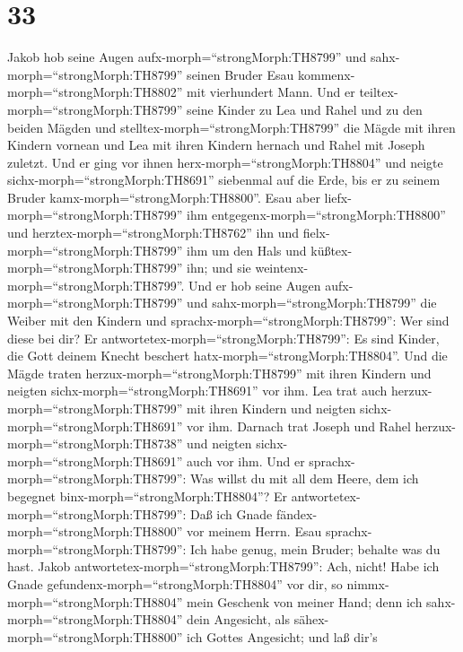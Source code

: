 \hypertarget{section-32}{%
\section{33}\label{section-32}}

 Jakob hob seine Augen aufx-morph=``strongMorph:TH8799'' und
sahx-morph=``strongMorph:TH8799'' seinen Bruder Esau
kommenx-morph=``strongMorph:TH8802'' mit vierhundert Mann. Und er
teiltex-morph=``strongMorph:TH8799'' seine Kinder zu Lea und Rahel und
zu den beiden Mägden  und
stelltex-morph=``strongMorph:TH8799'' die Mägde mit ihren Kindern
vornean und Lea mit ihren Kindern hernach und Rahel mit Joseph zuletzt.
 Und er ging vor ihnen herx-morph=``strongMorph:TH8804'' und
neigte sichx-morph=``strongMorph:TH8691'' siebenmal auf die Erde, bis er
zu seinem Bruder kamx-morph=``strongMorph:TH8800''.  Esau
aber liefx-morph=``strongMorph:TH8799'' ihm
entgegenx-morph=``strongMorph:TH8800'' und
herztex-morph=``strongMorph:TH8762'' ihn und
fielx-morph=``strongMorph:TH8799'' ihm um den Hals und
küßtex-morph=``strongMorph:TH8799'' ihn; und sie
weintenx-morph=``strongMorph:TH8799''.  Und er hob seine
Augen aufx-morph=``strongMorph:TH8799'' und
sahx-morph=``strongMorph:TH8799'' die Weiber mit den Kindern und
sprachx-morph=``strongMorph:TH8799'': Wer sind diese bei dir? Er
antwortetex-morph=``strongMorph:TH8799'': Es sind Kinder, die Gott
deinem Knecht beschert hatx-morph=``strongMorph:TH8804''. 
Und die Mägde traten herzux-morph=``strongMorph:TH8799'' mit ihren
Kindern und neigten sichx-morph=``strongMorph:TH8691'' vor ihm.
 Lea trat auch herzux-morph=``strongMorph:TH8799'' mit ihren
Kindern und neigten sichx-morph=``strongMorph:TH8691'' vor ihm. Darnach
trat Joseph und Rahel herzux-morph=``strongMorph:TH8738'' und neigten
sichx-morph=``strongMorph:TH8691'' auch vor ihm.  Und er
sprachx-morph=``strongMorph:TH8799'': Was willst du mit all dem Heere,
dem ich begegnet binx-morph=``strongMorph:TH8804''? Er
antwortetex-morph=``strongMorph:TH8799'': Daß ich Gnade
fändex-morph=``strongMorph:TH8800'' vor meinem Herrn.  Esau
sprachx-morph=``strongMorph:TH8799'': Ich habe genug, mein Bruder;
behalte was du hast.  Jakob
antwortetex-morph=``strongMorph:TH8799'': Ach, nicht! Habe ich Gnade
gefundenx-morph=``strongMorph:TH8804'' vor dir, so
nimmx-morph=``strongMorph:TH8804'' mein Geschenk von meiner Hand; denn
ich sahx-morph=``strongMorph:TH8804'' dein Angesicht, als
sähex-morph=``strongMorph:TH8800'' ich Gottes Angesicht; und laß dir's
